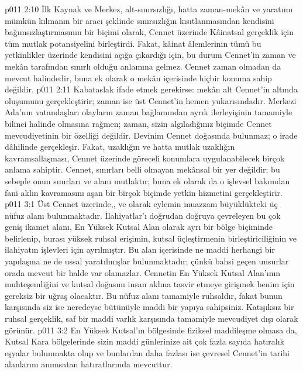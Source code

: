 \vs p011 2:10 İlk Kaynak ve Merkez, alt\hyp{}sınırsızlığı, hatta zaman\hyp{}mekân ve yaratımı mümkün kılmanın bir aracı şeklinde sınırsızlığın kısıtlanmasından kendisini bağımsızlaştırmasının bir biçimi olarak, Cennet üzerinde Kâinatsal gerçeklik için tüm mutlak potansiyelini birleştirdi. Fakat, kâinat âlemlerinin tümü bu yetkinlikler üzerinde kendisini açığa çıkardığı için, bu durum Cennet’in zaman ve mekân tarafından sınırlı olduğu anlamına gelmez. Cennet zaman olmadan da mevcut halindedir, buna ek olarak o mekân içerisinde hiçbir konuma sahip değildir.
\vs p011 2:11 Kabataslak ifade etmek gerekirse: mekân alt Cennet’in altında oluşumunu gerçekleştirir; zaman ise üst Cennet’in hemen yukarısındadır. Merkezi Ada’nın vatandaşları olayların zaman bağlamından ayrık ilerleyişinin tamamiyle bilinci halinde olmasına rağmen; zaman, sizin algıladığınız biçimde Cennet mevcudiyetinin bir özelliği değildir. Devinim Cennet doğasında bulunmaz; o irade dâhilinde gerçekleşir. Fakat, uzaklığın ve hatta mutlak uzaklığın kavramsallaşması, Cennet üzerinde göreceli konumlara uygulanabilecek birçok anlama sahiptir. Cennet, sınırları belli olmayan mekânsal bir yer değildir; bu sebeple onun sınırları ve alanı mutlaktır; buna ek olarak da o işlevsel bakımdan fani aklın kavramasını aşan bir birçok biçimde yetkin hizmetini gerçekleştirir.
\vs p011 3:1 Üst Cennet üzerinde,,  ve  olarak eylemin muazzam büyüklükteki üç nüfuz alanı bulunmaktadır. İlahiyatlar’ı doğrudan doğruya çevreleyen bu çok geniş ikamet alanı, En Yüksek Kutsal Alan olarak ayrı bir bölge biçiminde belirlenip, burası yüksek ruhsal erişimin, kutsal üçleştirmenin birleştiriciliğinin ve ilahiyatın işlevleri için ayrılmıştır. Bu alan içerisinde ne maddi herhangi bir yapılaşma ne de ussal yaratılmışlar bulunmaktadır; çünkü bahsi geçen unsurlar orada mevcut bir halde var olamazlar. Cennetin En Yüksek Kutsal Alan’ının muhteşemliğini ve kutsal doğasını insan aklına tasvir etmeye girişmek benim için gereksiz bir uğraş olacaktır. Bu nüfuz alanı tamamiyle ruhsaldır, fakat bunun karşısında siz ise neredeyse bütünüyle maddi bir yapıya sahipsiniz. Katışıksız bir ruhsal gerçeklik, saf bir maddi varlık karşısında tamamiyle mevcudiyet dışı olarak görünür.
\vs p011 3:2 En Yüksek Kutsal’ın bölgesinde fiziksel maddileşme olmasa da, Kutsal Kara bölgelerinde sizin maddi günlerinize ait çok fazla sayıda hatıralık eşyalar bulunmakta olup ve bunlardan daha fazlası ise çevresel Cennet’in tarihi alanlarını anımsatan hatıratlarında mevcuttur.

